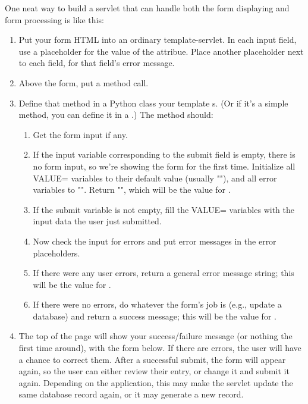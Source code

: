 One neat way to build a servlet that can handle both the form displaying and
form processing is like this:

\begin{enumerate}
\item Put your form HTML into an ordinary template-servlet.  In each input 
    field, use a placeholder for the value of the  attribue.
    Place another placeholder next to each field, for that field's error
    message.
\item Above the form, put a  method call.
\item Define that method in a Python class your template s.  (Or
    if it's a simple method, you can define it in a .)  The method
    should:
    \begin{enumerate}
    \item Get the form input if any.
    \item If the input variable corresponding to the submit field is empty,
        there is no form input, so we're showing the form for the first time.
        Initialize all VALUE= variables to their default value (usually ""),
        and all error variables to "".  Return "", which will be the value for
        .
    \item If the submit variable is not empty, fill the VALUE= variables with
        the input data the user just submitted.
    \item Now check the input for errors and put error messages in the error
        placeholders.  
    \item If there were any user errors, return a general error message
        string; this will be the value for .
    \item If there were no errors, do whatever the form's job is (e.g., update
        a database) and return a success message; this will be the value for
        .
    \end{enumerate}
\item The top of the page will show your success/failure message (or nothing
the first time around), with the form below.  If there are errors, the user
will have a chance to correct them.  After a successful submit, the form will
appear again, so the user can either review their entry, or change it and
submit it again.  Depending on the application, this may make the servlet
update the same database record again, or it may generate a new record.
\end{enumerate}

